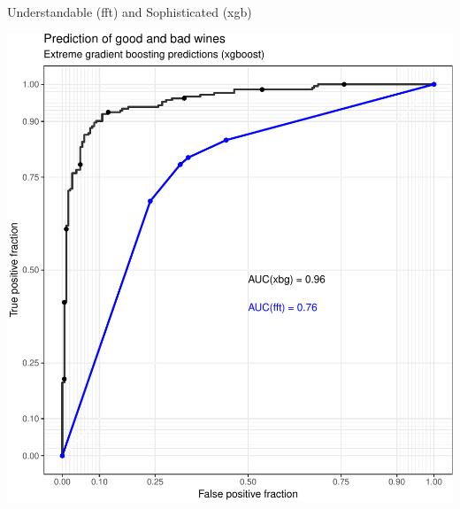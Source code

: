 \documentclass[ignorenonframetext,]{beamer}
\begin{document}
\begin{frame}{Understandable (fft) and Sophisticated (xgb)}

\includegraphics[width=0.95\linewidth]{ML_with_caret_files/figure-beamer/compare_fft_xgb-1}

\end{frame}
\end{document}
